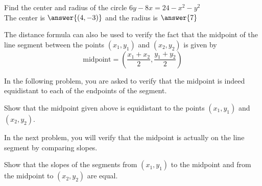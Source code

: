 \documentclass[handout]{ximera}
\begin{document}
\begin{problem}
Find the center and radius of the circle $6y - 8x= 24 -x^2 - y^2$\\
The center is $\answer{(4, -3)}$ and the radius is $\answer{7}$\\
\end{problem}

The distance formula can also be used to verify the fact that the midpoint of the line segment between the points 
$(x_1,y_1)$ and $(x_2, y_2)$ is given by
\[
\text{midpoint} = \left(\frac{x_1+x_2}{2}, \frac{y_1+y_2}{2}\right)
\]

In the following problem, you are asked to verify that the midpoint is indeed equidistant to each of the endpoints of the segment.
\begin{problem}
Show that the midpoint given above is equidistant to the points $(x_1, y_1)$ and $(x_2, y_2)$.
\end{problem}
In the next problem, you will verify that the midpoint is actually on the line segment by comparing slopes.
\begin{problem}
Show that the slopes of the segments from $(x_1, y_1)$ to the midpoint and from the midpoint to $(x_2, y_2)$ are equal.
\end{problem}
\end{document}
